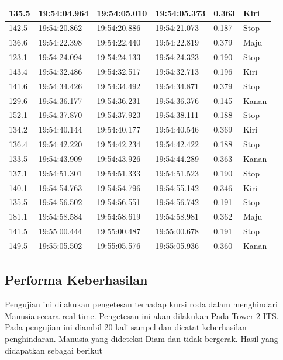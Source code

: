 \begin{table}[H]
\begin{tabular}{|l|l|l|l|l|l|}
        135.5 & 19:54:04.964 & 19:54:05.010 & 19:54:05.373 & 0.363 & Kiri \\ \hline
        142.5 & 19:54:20.862 & 19:54:20.886 & 19:54:21.073 & 0.187 & Stop \\ \hline
        136.6 & 19:54:22.398 & 19:54:22.440 & 19:54:22.819 & 0.379 & Maju \\ \hline
        123.1 & 19:54:24.094 & 19:54:24.133 & 19:54:24.323 & 0.190 & Stop \\ \hline
        143.4 & 19:54:32.486 & 19:54:32.517 & 19:54:32.713 & 0.196 & Kiri \\ \hline
        141.6 & 19:54:34.426 & 19:54:34.492 & 19:54:34.871 & 0.379 & Stop \\ \hline
        129.6 & 19:54:36.177 & 19:54:36.231 & 19:54:36.376 & 0.145 & Kanan \\ \hline
        152.1 & 19:54:37.870 & 19:54:37.923 & 19:54:38.111 & 0.188 & Stop \\ \hline
        134.2 & 19:54:40.144 & 19:54:40.177 & 19:54:40.546 & 0.369 & Kiri \\ \hline
        136.4 & 19:54:42.220 & 19:54:42.234 & 19:54:42.422 & 0.188 & Stop \\ \hline
        133.5 & 19:54:43.909 & 19:54:43.926 & 19:54:44.289 & 0.363 & Kanan \\ \hline
        137.1 & 19:54:51.301 & 19:54:51.333 & 19:54:51.523 & 0.190 & Stop \\ \hline
        140.1 & 19:54:54.763 & 19:54:54.796 & 19:54:55.142 & 0.346 & Kiri \\ \hline
        135.5 & 19:54:56.502 & 19:54:56.551 & 19:54:56.742 & 0.191 & Stop \\ \hline
        181.1 & 19:54:58.584 & 19:54:58.619 & 19:54:58.981 & 0.362 & Maju \\ \hline
        141.5 & 19:55:00.444 & 19:55:00.487 & 19:55:00.678 & 0.191 & Stop \\ \hline
        149.5 & 19:55:05.502 & 19:55:05.576 & 19:55:05.936 & 0.360 & Kanan \\ \hline
    \end{tabular}
\end{table}

\subsection{Performa Keberhasilan}
Pengujian ini dilakukan pengetesan terhadap kursi roda dalam menghindari Manusia secara real time. Pengetesan ini akan dilakukan Pada Tower 2 ITS. Pada pengujian ini diambil 20 kali sampel dan dicatat keberhasilan penghindaran. Manusia yang dideteksi Diam dan tidak bergerak. Hasil yang didapatkan sebagai berikut 

